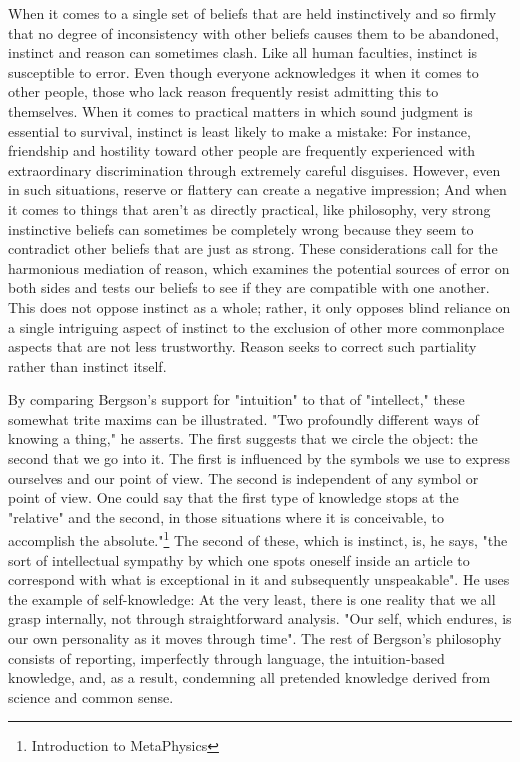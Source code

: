 \documentclass[a4paper,12pt]{book}[2004/02/16]
\theoremstyle{ilemma}
\theoremstyle{itheorem}
\theoremstyle{iother}
\theoremstyle{icorollary}
\theoremstyle{numcorollary}
\theoremstyle{idefinition}
\begin{document}
When it comes to a single set of beliefs that are held instinctively and so firmly that no degree of inconsistency with other beliefs causes them to be abandoned, instinct and reason can sometimes clash.
Like all human faculties, instinct is susceptible to error. Even though everyone acknowledges it when it comes to other people, those who lack reason frequently resist admitting this to themselves. When it comes to practical matters in which sound judgment is essential to survival, instinct is least likely to make a mistake: For instance, friendship and hostility toward other people are frequently experienced with extraordinary discrimination through extremely careful disguises. However, even in such situations, reserve or flattery can create a negative impression; And when it comes to things that aren't as directly practical, like philosophy, very strong instinctive beliefs can sometimes be completely wrong because they seem to contradict other beliefs that are just as strong. These considerations call for the harmonious mediation of reason, which examines the potential sources of error on both sides and tests our beliefs to see if they are compatible with one another. This does not oppose instinct as a whole; rather, it only opposes blind reliance on a single intriguing aspect of instinct to the exclusion of other more commonplace aspects that are not less trustworthy. Reason seeks to correct such partiality rather than instinct itself.

By comparing Bergson's support for "intuition" to that of "intellect," these somewhat trite maxims can be illustrated. "Two profoundly different ways of knowing a thing," he asserts. The first suggests that we circle the object: the second that we go into
it. The first is influenced by the symbols we use to express ourselves and our point of view. The second is independent of any symbol or point of view. One could say that the first type of knowledge stops at the "relative" and the second, in those
situations where it is conceivable, to accomplish the absolute."\footnote{Introduction to MetaPhysics} The second
of these, which is instinct, is, he says, "the sort of intellectual
sympathy by which one spots oneself inside an article to
correspond with what is exceptional in it and subsequently unspeakable".  He uses the example of self-knowledge: At the very least, there is one reality that we all grasp internally, not through straightforward analysis. "Our self, which endures, is our own personality as it moves through time". The rest of Bergson's philosophy consists of reporting, imperfectly through language, the intuition-based knowledge, and, as a result, condemning all pretended knowledge derived from science and common sense.
\end{document}
